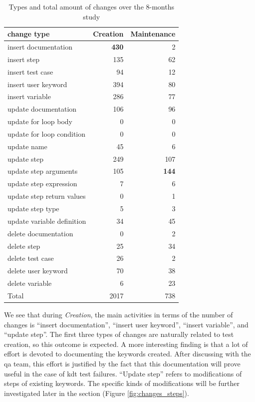 \begin{table}
\caption{Types and total amount of changes over the 8-months study}
\label{table:total_changes}
\centering
\begin{tabular}{lrr}
\toprule
change type &  Creation &  Maintenance \\
\midrule
insert documentation          &       \textbf{430} &            2 \\
insert step                   &       135 &           62 \\
insert test case              &        94 &           12 \\
insert user keyword           &       394 &           80 \\
insert variable               &       286 &           77 \\
update documentation       &       106 &           96 \\
update for loop body       &         0 &            0 \\
update for loop condition  &         0 &            0 \\
update name                &        45 &            6 \\
update step                &       249 &          107 \\
update step arguments      &       105 &          \textbf{144} \\
update step expression     &         7 &            6 \\
update step return values  &         0 &            1 \\
update step type           &         5 &            3 \\
update variable definition &        34 &           45 \\
delete documentation       &         0 &            2 \\
delete step                &        25 &           34 \\
delete test case           &        26 &            2 \\
delete user keyword        &        70 &           38 \\
delete variable            &         6 &           23 \\
\midrule
Total                      &      2017 &          738 \\
\bottomrule
\end{tabular}
\end{table}

We see that during \emph{Creation}, the main activities in terms of the number of changes is ``insert documentation'', ``insert user keyword'', ``insert variable'', and ``update step''. The first three types of changes are naturally related to test creation, so this outcome is expected. A more interesting finding is that a lot of effort is devoted to documenting the keywords created. After discussing with the \gls{qa} team, this effort is justified by the fact that this documentation will prove useful in the case of \gls{kdt} test failures. ``Update step'' refers to modifications of steps of existing keywords. The specific kinds of modifications will be further investigated later in the section (Figure \ref{fig:changes_steps}).
  
